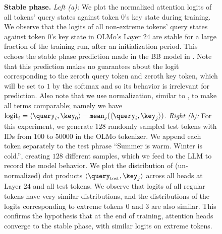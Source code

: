 \begin{figure}[thp]
\begin{subfigure}[t]{0.32\textwidth}
        \label{fig:attention_logits_olmo_static}
    \end{subfigure}
    \hfill
    \phantom{.}
    \vspace{-2em}
    \caption{\small \textbf{Stable phase.}  \textit{Left (a):} We plot the normalized attention logits of all tokens' query states against token \(0\)'s key state during training. We observe that the logits of all non-extreme tokens' query states against token \(0\)'s key state in OLMo's Layer 24 are stable for a large fraction of the training run, after an initialization period. This echoes the stable phase prediction made in the BB model in . Note that this prediction makes no guarantees about the logit corresponding to the zeroth query token and zeroth key token, which will be set to \(1\) by the softmax and so its behavior is irrelevant for prediction. Also note that we use normalization, similar to , to make all terms comparable; namely we have \(\mathrm{logit}_{i} = \langle \query_{i}, \key_{0}\rangle - \mathtt{mean}_{j}(\langle \query_{i}, \key_{j}\rangle)\). \textit{Right (b):} For this experiment, we generate \(128\) randomly sampled test tokens with IDs from \(100\) to \(50000\) in the OLMo tokenizer. We append each token separately to the test phrase ``Summer is warm. Winter is cold.'', creating \(128\) different samples, which we feed to the LLM to record the model behavior. We plot the distribution of (un-normalized) dot products \(\langle \query_{\mathrm{test}}, \key_{j}\rangle\) across all heads at Layer 24 and all test tokens. We observe that logits of all regular tokens have very similar distributions, and the distributions of the logits corresponding to extreme tokens \(0\) and \(3\) are also similar. This confirms the hypothesis that at the end of training, attention heads converge to the stable phase, with similar logits on extreme tokens.}
    \label{fig:olmo_predictions_phase1}
\end{figure}




